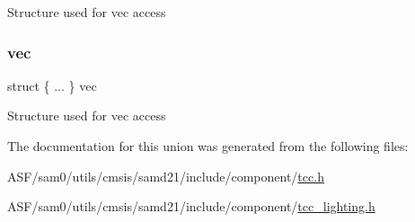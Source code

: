 Structure used for vec access \mbox{\label{union_t_c_c___c_t_r_l_a___type_a1d5b22b2a7876729d40bed15d8389f9e}} 
\subsubsection{\texorpdfstring{vec}{vec}\hspace{0.1cm}{\footnotesize\ttfamily [2/2]}}
{\footnotesize\ttfamily struct \{ ... \}   vec}

Structure used for vec access 

The documentation for this union was generated from the following files\+:\begin{DoxyCompactItemize}
\item 
A\+S\+F/sam0/utils/cmsis/samd21/include/component/\mbox{\hyperlink{tcc_8h}{tcc.\+h}}\item 
A\+S\+F/sam0/utils/cmsis/samd21/include/component/\mbox{\hyperlink{tcc__lighting_8h}{tcc\+\_\+lighting.\+h}}\end{DoxyCompactItemize}
